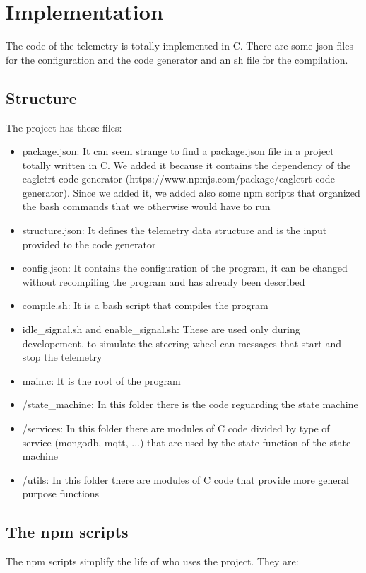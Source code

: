 \section{\huge{Implementation}}
The code of the telemetry is totally implemented in C. There are some json files for the configuration and the code 
generator and an sh file for the compilation.

\subsection{Structure}
The project has these files:

\begin{itemize}
    \item package.json: It can seem strange to find a package.json file in a project totally written in C. We added it because it contains the dependency of the eagletrt-code-generator (https://www.npmjs.com/package/eagletrt-code-generator). Since we added it, we added also some npm scripts that organized the bash commands that we otherwise would have to run
    \item structure.json: It defines the telemetry data structure and is the input provided to the code generator
    \item config.json: It contains the configuration of the program, it can be changed without recompiling the program and has already been described
    \item compile.sh: It is a bash script that compiles the program
    \item idle\_signal.sh and enable\_signal.sh: These are used only during developement, to simulate the steering wheel can messages that start and stop the telemetry
    \item main.c: It is the root of the program
    \item /state\_machine: In this folder there is the code reguarding the state machine
    \item /services: In this folder there are modules of C code divided by type of service (mongodb, mqtt, ...) that are used by the state function of the state machine
    \item /utils: In this folder there are modules of C code that provide more general purpose functions
\end{itemize}

\subsection{The npm scripts}
The npm scripts simplify the life of who uses the project. They are:

